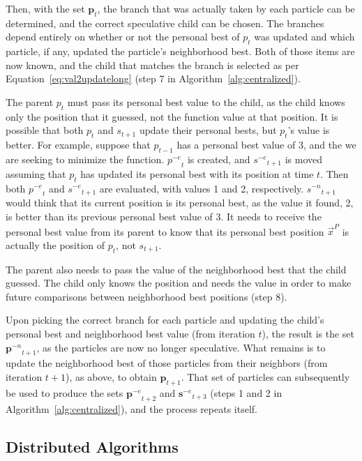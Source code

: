 \documentclass[journal,letterpaper]{IEEEtran}
\newcommand{\alg}[1]{Algorithm~\ref{alg:#1}}
\providecommand{\pers}{\ensuremath{P}}
\providecommand{\pbest}{\ensuremath{\Vec{x}^\pers}}
\providecommand{\noeval}[1]{\ensuremath{#1^{-e}}}
\providecommand{\nonbest}[1]{\ensuremath{#1^{-n}}}
\providecommand{\p}{\ensuremath{p}}
\providecommand{\pset}{\ensuremath{\mathbf{p}}}
\providecommand{\s}{\ensuremath{s}}
\providecommand{\sset}{\ensuremath{\mathbf{s}}}
\begin{document}
Then, with the set $\pset_t$, the branch that was actually taken by each
particle can be determined, and the correct speculative child can be chosen.
The branches depend entirely on whether or not the personal best of $p_t$ was
updated and which particle, if any, updated the particle's neighborhood best.
Both of those items are now known, and the child that matches the branch is
selected as per Equation~\eqref{eq:val2updatelong} (step 7 in
\alg{centralized}).

The parent $\p_t$ must pass its personal best value to the child, as the child
knows only the position that it guessed, not the function value at that
position.  It is possible that both $\p_t$ and $\s_{t+1}$ update their personal
bests, but $\p_t$'s value is better.  For example, suppose that $\p_{t-1}$ has
a personal best value of 3, and the we are seeking to minimize the function.
$\noeval{\p}_t$ is created, and $\noeval{\s}_{t+1}$ is moved assuming that
$\p_t$ has updated its personal best with its position at time $t$.  Then both
$\noeval{\p}_t$ and $\noeval{\s}_{t+1}$ are evaluated, with values 1 and 2,
respectively.  $\nonbest{\s}_{t+1}$ would think that its current position is
its personal best, as the value it found, 2, is better than its previous
personal best value of 3.  It needs to receive the personal best value from its
parent to know that its personal best position $\pbest$ is actually the
position of $\p_t$, not $\s_{t+1}$.

The parent also needs to pass the value of the neighborhood best that the child
guessed.  The child only knows the position and needs the value in order to
make future comparisons between neighborhood best positions (step 8).

Upon picking the correct branch for each particle and updating the child's
personal best and neighborhood best value (from iteration $t$), the result is
the set $\nonbest{\pset}_{t+1}$, as the particles are now no longer
speculative.  What remains is to update the neighborhood best of those
particles from their neighbors (from iteration $t+1$), as above, to obtain
$\pset_{t+1}$.  That set of particles can subsequently be used to produce the
sets $\noeval{\pset}_{t+2}$ and $\noeval{\sset}_{t+3}$ (steps 1 and 2 in
\alg{centralized}), and the process repeats itself.

\subsection{Distributed Algorithms}
\end{document}
